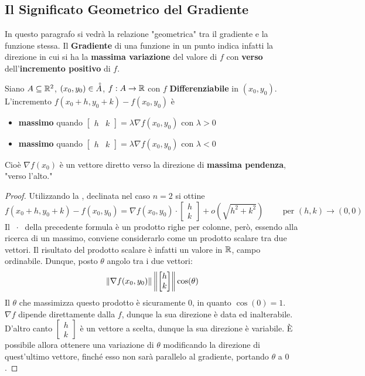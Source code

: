 \subsection{Il Significato Geometrico del Gradiente}
In questo paragrafo si vedrà la relazione "geometrica" tra il gradiente e la funzione stessa. Il \textbf{Gradiente} di una funzione in un punto indica infatti la direzione in cui si ha la \textbf{massima variazione} del valore di $f$ con \textbf{verso} dell'\textbf{incremento positivo} di $f$.
\begin{proposition}
	Siano $A \subseteq \mathbb{R}^2$, $(x_0, y_0) \in \accentset{\circ}{A}$, $f: A \to \mathbb{R}$ con $f$ \textbf{Differenziabile} in $(x_0, y_0)$.\\
	L'incremento $f(x_0 + h, y_0 + k) - f(x_0, y_0)$ è
	\begin{itemize}[noitemsep]
		\item \textbf{massimo} quando $\begin{bmatrix}h & k\end{bmatrix} = \lambda \nabla f(x_0, y_0)$ con $\lambda > 0$
		\item \textbf{massimo} quando $\begin{bmatrix}h & k\end{bmatrix} = \lambda \nabla f(x_0, y_0)$ con $\lambda < 0$
	\end{itemize}
	Cioè $\nabla f(x_0)$ è un vettore diretto verso la direzione di \textbf{massima pendenza}, "verso l'alto."
	\begin{proof}
		Utilizzando la , declinata nel caso $n = 2$ si ottine
		\begin{equation}
			\label{eq:dim_dir_grad}
			f(x_0 + h, y_0 + k) -
			f(x_0, y_0) =
			\nabla f(x_0, y_0) \cdot
			\begin{bmatrix}
				h\\k
			\end{bmatrix} +
			o(\sqrt{h^2 + k^2})
			\qquad \text{ per } (h,k) \to (0,0)
		\end{equation}
		Il $\;\cdot\;$ della precedente formula è un prodotto righe per colonne, però, essendo alla ricerca di un massimo, conviene considerarlo come un prodotto scalare tra due vettori. Il risultato del prodotto scalare è infatti un valore in $\mathbb{R}$, campo ordinabile. Dunque, posto $\theta$ angolo tra i due vettori:
		\[\left\|\nabla f(x_0, y_0)\right\| \left\|\begin{bmatrix}h\\k\end{bmatrix}\right\| \cos(\theta)\]
		Il $\theta$ che massimizza questo prodotto è sicuramente $0$, in quanto $\cos(0) = 1$.\\
		$\nabla f$ dipende direttamente dalla $f$, dunque la sua direzione è data ed inalterabile. D'altro canto $\begin{bmatrix}h\\k\end{bmatrix}$ è un vettore a scelta, dunque la sua direzione è variabile. È possibile allora ottenere una variazione di $\theta$ modificando la direzione di quest'ultimo vettore, finché esso non sarà parallelo al gradiente, portando $\theta$ a $0$.


\end{proof}
\end{proposition}
